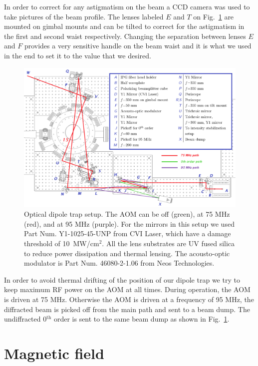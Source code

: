 \documentclass[oneside,12pt]{memoir}
\begin{document}
In order to correct for any astigmatism on the beam  a CCD camera was used to
take pictures of the beam profile. The lenses labeled $E$ and $T$ on
Fig.~\ref{fig:odtsetup} are mounted on gimbal mounts and can be tilted to
correct for the astigmatism in the first and second waist respectively.
Changing the separation between lenses $E$ and $F$ provides a very sensitive
handle on the beam waist and it is what we used in the end to set it to the
value that we desired.  \begin{figure} \centering
\includegraphics[width=\textwidth]{../figures/odt/opticalsetup/setup.pdf}
\caption[Optical dipole trap setup]{\small Optical dipole trap setup.  The AOM
can be off (green), at 75 MHz (red), and at 95 MHz (purple).  For the mirrors in
this setup we used Part Num. Y1-1025-45-UNP from CVI Laser, which have a damage
threshold of 10~MW/cm$^{2}$.  All the lens substrates are UV fused silica to
reduce power dissipation and thermal lensing.  The acousto-optic modulator is
Part Num.  46080-2-1.06 from Neos Technologies.  } \label{fig:odtsetup}
\end{figure}

In order to avoid thermal drifting of the position of our dipole trap we try to
keep maximum RF power on the AOM at all times.  During operation, the AOM is
driven at 75 MHz.  Otherwise the AOM is driven at a frequency of 95 MHz, the
diffracted beam is picked off from the main path and sent to a beam dump.  The
undiffracted 0$^{\mathrm{th}}$ order is sent to the same beam dump as shown in
Fig.~\ref{fig:odtsetup}.   


\section{Magnetic field}
\end{document}
